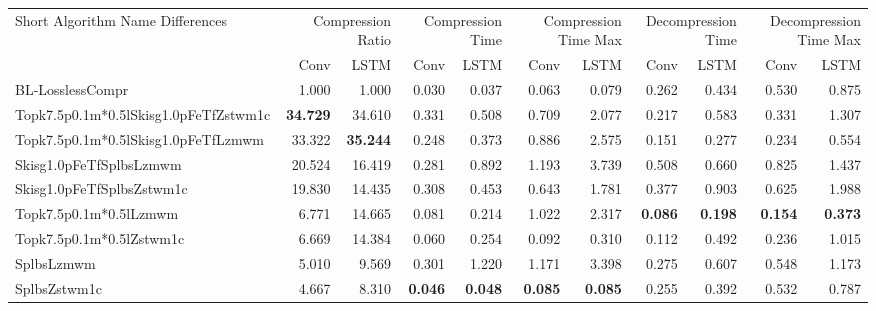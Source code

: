 \begin{tabular}{lrrrrrrrrrr}
\toprule
\multicolumn{1}{p{2.5cm}}{Short Algorithm Name Differences} & \multicolumn{2}{p{1.8cm}}{Compression Ratio} & \multicolumn{2}{p{1.8cm}}{Compression Time} & \multicolumn{2}{p{1.8cm}}{Compression Time Max} & \multicolumn{2}{p{1.8cm}}{Decompression Time} & \multicolumn{2}{p{1.8cm}}{Decompression Time Max} \\
 & Conv & LSTM & Conv & LSTM & Conv & LSTM & Conv & LSTM & Conv & LSTM \\
\midrule
BL-LosslessCompr & 1.000 & 1.000 & 0.030 & 0.037 & 0.063 & 0.079 & 0.262 & 0.434 & 0.530 & 0.875 \\
Topk7.5p0.1m*0.5lSkisg1.0pFeTfZstwm1c & \bfseries 34.729 & 34.610 & 0.331 & 0.508 & 0.709 & 2.077 & 0.217 & 0.583 & 0.331 & 1.307 \\
Topk7.5p0.1m*0.5lSkisg1.0pFeTfLzmwm & 33.322 & \bfseries 35.244 & 0.248 & 0.373 & 0.886 & 2.575 & 0.151 & 0.277 & 0.234 & 0.554 \\
Skisg1.0pFeTfSplbsLzmwm & 20.524 & 16.419 & 0.281 & 0.892 & 1.193 & 3.739 & 0.508 & 0.660 & 0.825 & 1.437 \\
Skisg1.0pFeTfSplbsZstwm1c & 19.830 & 14.435 & 0.308 & 0.453 & 0.643 & 1.781 & 0.377 & 0.903 & 0.625 & 1.988 \\
Topk7.5p0.1m*0.5lLzmwm & 6.771 & 14.665 & 0.081 & 0.214 & 1.022 & 2.317 & \bfseries 0.086 & \bfseries 0.198 & \bfseries 0.154 & \bfseries 0.373 \\
Topk7.5p0.1m*0.5lZstwm1c & 6.669 & 14.384 & 0.060 & 0.254 & 0.092 & 0.310 & 0.112 & 0.492 & 0.236 & 1.015 \\
SplbsLzmwm & 5.010 & 9.569 & 0.301 & 1.220 & 1.171 & 3.398 & 0.275 & 0.607 & 0.548 & 1.173 \\
SplbsZstwm1c & 4.667 & 8.310 & \bfseries 0.046 & \bfseries 0.048 & \bfseries 0.085 & \bfseries 0.085 & 0.255 & 0.392 & 0.532 & 0.787 \\
\bottomrule
\end{tabular}
